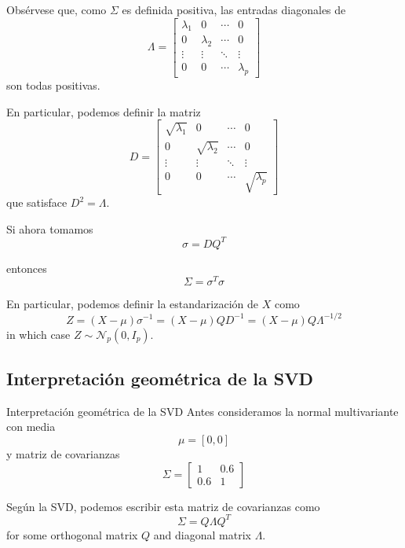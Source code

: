 \documentclass[
  11pt,
  ignorenonframetext,
  aspectratio=169]{beamer}
\theoremstyle{plain}
\theoremstyle{definition}
\theoremstyle{remark}
\begin{document}
\begin{frame}{}
\label{section-8}
Obsérvese que, como \(\Sigma\) es definida positiva, las entradas
diagonales de \[
\Lambda = \left[
\begin{array}{cccc}
\lambda_1 & 0 & \cdots & 0 \\
0 & \lambda_2 & \cdots & 0 \\
\vdots & \vdots & \ddots & \vdots \\
0 & 0 & \cdots & \lambda_p
\end{array}
\right]
\] son todas positivas.

\bigpause

En particular, podemos definir la matriz \[
D = \left[
\begin{array}{cccc}
\sqrt{\lambda_1} & 0 & \cdots & 0 \\
0 & \sqrt{\lambda_2} & \cdots & 0 \\
\vdots & \vdots & \ddots & \vdots \\
0 & 0 & \cdots & \sqrt{\lambda_p}
\end{array}
\right]
\] que satisface \(D^2 = \Lambda\).
\end{frame}

\begin{frame}{}
\label{section-9}
Si ahora tomamos \[ 
\sigma = D Q^{T}
\]

\bigpause

entonces \[
\Sigma = \sigma^{T} \sigma
\]

\bigpause

En particular, podemos definir la \alert{estandarización} de \(X\) como
\[
Z = (X - \mu) \sigma^{-1} = (X - \mu) Q D^{-1} = (X - \mu) Q \Lambda^{-1/2}
\] in which case \(Z \sim \mathcal{N}_{p}(0, I_p)\).
\end{frame}

\subsection{Interpretación geométrica de la
SVD}\label{interpretaciuxf3n-geomuxe9trica-de-la-svd}

\begin{frame}{Interpretación geométrica de la SVD}
\label{interpretaciuxf3n-geomuxe9trica-de-la-svd-1}
Antes consideramos la normal multivariante con media \[ 
\mu = [0, 0] 
\] y matriz de covarianzas \[
\Sigma = \left[
\begin{array}{cc}
1 & 0.6 \\
0.6 & 1 
\end{array} 
\right] 
\]

\bigpause

Según la SVD, podemos escribir esta matriz de covarianzas como \[ 
\Sigma = Q \Lambda Q^{T} 
\] for some orthogonal matrix \(Q\) and diagonal matrix \(\Lambda\).
\end{frame}
\end{document}
